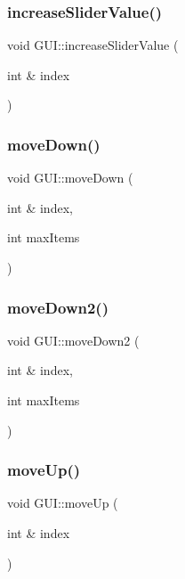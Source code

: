 \mbox{\label{class_g_u_i_ab37a32b8d4f5708d4a5af9a0203c5b40}} 
\subsubsection{\texorpdfstring{increaseSliderValue()}{increaseSliderValue()}}
{\footnotesize\ttfamily void G\+U\+I\+::increase\+Slider\+Value (\begin{DoxyParamCaption}\item[{int \&}]{index }\end{DoxyParamCaption})}

\mbox{\label{class_g_u_i_a49fba205ba96ff33daa0968be55824f8}} 
\subsubsection{\texorpdfstring{moveDown()}{moveDown()}}
{\footnotesize\ttfamily void G\+U\+I\+::move\+Down (\begin{DoxyParamCaption}\item[{int \&}]{index,  }\item[{int}]{max\+Items }\end{DoxyParamCaption})}

\mbox{\label{class_g_u_i_a9b7f21e20d6a5ace2f1578c5da278786}} 
\subsubsection{\texorpdfstring{moveDown2()}{moveDown2()}}
{\footnotesize\ttfamily void G\+U\+I\+::move\+Down2 (\begin{DoxyParamCaption}\item[{int \&}]{index,  }\item[{int}]{max\+Items }\end{DoxyParamCaption})}

\mbox{\label{class_g_u_i_a4cc91f9f39059fbe3b4b37ced715854c}} 
\subsubsection{\texorpdfstring{moveUp()}{moveUp()}}
{\footnotesize\ttfamily void G\+U\+I\+::move\+Up (\begin{DoxyParamCaption}\item[{int \&}]{index }\end{DoxyParamCaption})}

